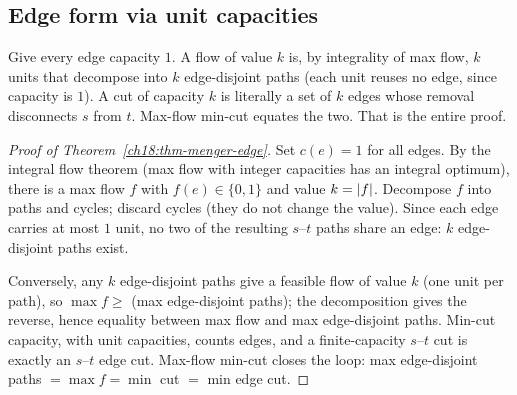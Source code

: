 \subsection{Edge form via unit capacities}

\begin{intuitionbox}
Give every edge capacity $1$. A flow of value $k$ is, by integrality of max flow, $k$ units that decompose into $k$ edge-disjoint paths (each unit reuses no edge, since capacity is $1$). A cut of capacity $k$ is literally a set of $k$ edges whose removal disconnects $s$ from $t$. Max-flow min-cut equates the two. That is the entire proof.
\end{intuitionbox}

\begin{proof}[Proof of Theorem~\ref{ch18:thm-menger-edge}]
Set $c(e)=1$ for all edges. By the integral flow theorem (max flow with integer capacities has an integral optimum), there is a max flow $f$ with $f(e)\in\{0,1\}$ and value $k=\lvert f\rvert$. Decompose $f$ into paths and cycles; discard cycles (they do not change the value). Since each edge carries at most $1$ unit, no two of the resulting $s$--$t$ paths share an edge: $k$ edge-disjoint paths exist.

Conversely, any $k$ edge-disjoint paths give a feasible flow of value $k$ (one unit per path), so $\max f \ge$ (max edge-disjoint paths); the decomposition gives the reverse, hence equality between max flow and max edge-disjoint paths. Min-cut capacity, with unit capacities, counts edges, and a finite-capacity $s$--$t$ cut is exactly an $s$--$t$ edge cut. Max-flow min-cut closes the loop: max edge-disjoint paths $=\max f = \min$ cut $=$ min edge cut.
\end{proof}

